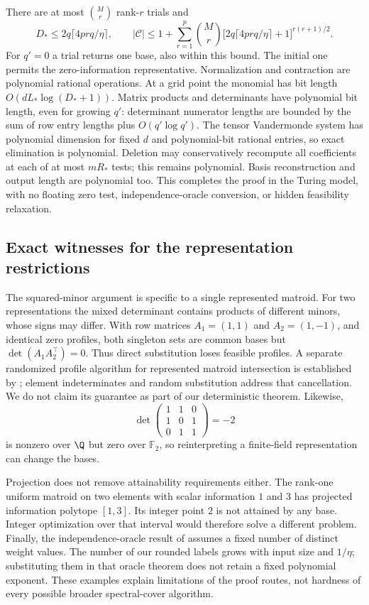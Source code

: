 There are at most $\binom Mr$ rank-$r$ trials and
\[
 D_*\le2q\lceil4prq/\eta\rceil,
 \qquad
 |\mathcal C|\le1+\sum_{r=1}^p\binom Mr
 \bigl[2q\lceil4prq/\eta\rceil+1\bigr]^{r(r+1)/2}.
\]
For $q'=0$ a trial returns one base, also within this bound. The initial one
permits the zero-information representative. Normalization and contraction
are polynomial rational operations. At a grid point the monomial has bit
length $O(dL_*\log(D_*+1))$. Matrix products and determinants have polynomial
bit length, even for growing $q'$: determinant numerator lengths are bounded
by the sum of row entry lengths plus $O(q'\log q')$. The tensor Vandermonde
system has polynomial dimension for fixed $d$ and polynomial-bit rational
entries, so exact elimination is polynomial. Deletion may conservatively
recompute all coefficients at each of at most $mR_*$ tests; this remains
polynomial. Basis reconstruction and output length are polynomial too.
This completes the proof in the Turing model, with no floating zero test,
independence-oracle conversion, or hidden feasibility relaxation.

\subsection{Exact witnesses for the representation restrictions}
The squared-minor argument is specific to a single represented matroid.
For two representations the mixed determinant contains products of different
minors, whose signs may differ. With row matrices $A_1=(1,1)$ and
$A_2=(1,-1)$, and identical zero profiles, both singleton sets are common
bases but $\det(A_1A_2^\top)=0$. Thus direct substitution loses feasible
profiles. A separate randomized profile algorithm for represented matroid
intersection is established by \citet[Section 3]{Berstein2010}; element
indeterminates and random substitution address that cancellation. We do not
claim its guarantee as part of our deterministic theorem. Likewise,
\[
 \det\begin{pmatrix}1&1&0\\1&0&1\\0&1&1\end{pmatrix}=-2
\]
is nonzero over $\Q$ but zero over $\mathbb F_2$, so reinterpreting a
finite-field representation can change the bases.

Projection does not remove attainability requirements either. The rank-one
uniform matroid on two elements with scalar information $1$ and $3$ has
projected information polytope $[1,3]$. Its integer point $2$ is not attained
by any base. Integer optimization over that interval would therefore solve
a different problem. Finally, the independence-oracle result of
\citet[Theorem 1.1]{Berstein2008} assumes a fixed number of distinct weight
values. The number of our rounded labels grows with input size and
$1/\eta$; substituting them in that oracle theorem does not retain a fixed
polynomial exponent. These examples explain limitations of the proof routes,
not hardness of every possible broader spectral-cover algorithm.
